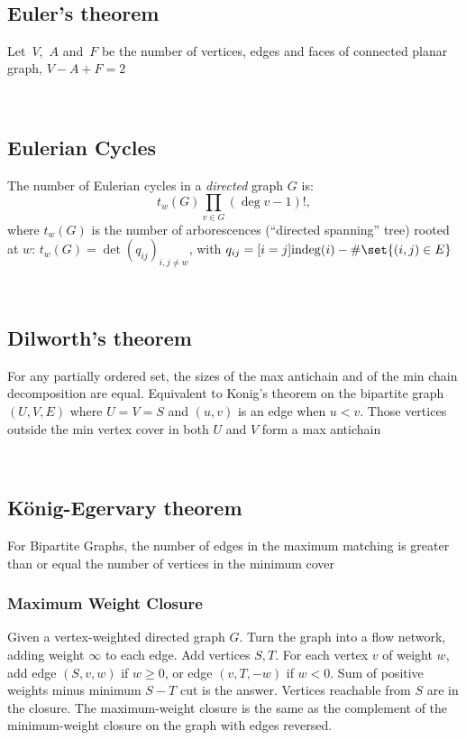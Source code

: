 \

\subsection{Euler's theorem}
Let~$V$,~$A$ and~$F$ be the number of vertices, edges and faces of connected planar graph, $V - A + F = 2$


\

\subsection{Eulerian Cycles}
The number of Eulerian cycles in a \emph{directed} graph $G$ is:
\begin{equation*}
	t_w(G) \prod_{v \in G} (\deg v - 1)!,
\end{equation*}
where $t_w(G)$ is the number of arborescences (``directed spanning'' tree) rooted at $w$: $t_w(G) = \det\left( q_{ij} \right)_{i,j \neq w}$, with $q_{ij} = [i=j] \mathrm{indeg}(i) - \# \set{(i,j) \in E}$

\

\subsection{Dilworth's theorem}
For any partially ordered set, the sizes of the max antichain and of the min chain decomposition are equal. Equivalent to Konig's theorem on the bipartite graph $(U,V,E)$ where $U=V=S$ and $(u,v)$ is an edge when $u<v$. Those vertices outside the min vertex cover in both $U$ and $V$ form a max antichain

\

\subsection{König-Egervary theorem}
For Bipartite Graphs, the number of edges in the maximum matching is greater than or equal the number of vertices in the minimum cover


\subsubsection{Maximum Weight Closure}
Given a vertex-weighted directed graph $G$. Turn the graph into a flow
network, adding weight $\infty$ to each edge. Add vertices $S,T$. For
each vertex $v$ of weight $w$, add edge $(S,v,w)$ if $w\geq 0$, or edge
$(v,T,-w)$ if $w<0$. Sum of positive weights minus minimum $S-T$ cut is
the answer. Vertices reachable from $S$ are in the closure. The
maximum-weight closure is the same as the complement of the
minimum-weight closure on the graph with edges reversed.

